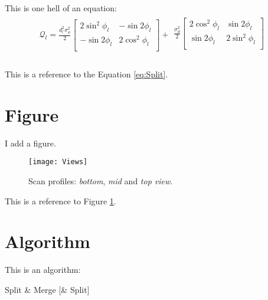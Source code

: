 This is one hell of an equation:
\begin{equation}
\begin{array}{c}
 \mathcal{Q}_l  = \frac{{d_l ^2 \sigma _\phi  ^2 }}{2}\left[ {\begin{array}{cc}
   {2\sin ^2 \phi _l } & { - \sin 2\phi _l }  \\
   { - \sin 2\phi _l } & {2\cos ^2 \phi _l }  \\
\end{array}} \right] +
 \begin{array}{cc}
   {\frac{{\sigma _d ^2 }}{2}\left[ {\begin{array}{cc}
   {2\cos ^2 \phi _l } & {\sin 2\phi _l }  \\
   {\sin 2\phi _l } & {2\sin ^2 \phi _l }  \\
\end{array}} \right]}  \\
\end{array} \\
 \end{array}
\label{eq:defQ}
\end{equation}

This is a reference to the Equation \ref{eq:Split}.

\section{Figure}
\label{sec:figure}

I add a figure.
\begin{figure}
\centering
\texttt{[image: Views]}
\caption{Scan profiles: \emph{bottom}, \emph{mid} and \emph{top view}.}
\label{fig:views}
\end{figure}

This is a reference to Figure \ref{fig:views}.

\section{Algorithm} 
\label{sec:algorithm}

This is an algorithm:
\begin{algorithm}
\label{alg:SMS}
\caption{Split \& Merge [\& Split]}
\begin{algorithmic} [1]
\ELSE
{}
\ENDIF
\ENDWHILE
{}
\end{algorithmic}
\end{algorithm}